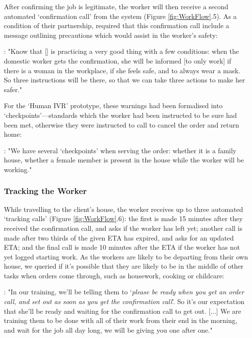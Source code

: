After confirming the job is legitimate, the worker will then receive a second automated `confirmation call' from the system (Figure \ref{fig:WorkFlow}.5). As a condition of their partnership, \NGO{} required that this confirmation call include a message outlining precautions which would assist in the worker's safety:

\begin{displayquote}
\textbf{\NGOOne{}}: "Know that [\PC{}] is practicing a very good thing with a few conditions: when the domestic worker gets the confirmation, she will be informed [to only work] if  there is a woman in the workplace, if she feels safe, and to always wear a mask. So three instructions will be there, so that we can take three actions to make her safer."
\end{displayquote}

For the `Human IVR' prototype, these warnings had been formalised into `checkpoints'---standards which the worker had been instructed to be sure had been met, otherwise they were instructed to call \PC{} to cancel the order and return home:

\begin{displayquote}
\textbf{\PCTwo{}}: "We have several ‘checkpoints’ when serving the order: whether it is a family house, whether a female member is present in the house while the worker will be working."
\end{displayquote}

\subsubsection{Tracking the Worker}

While travelling to the client's house, the worker receives up to three automated `tracking calls' (Figure \ref{fig:WorkFlow}.6): the first is made 15 minutes after they received the confirmation call, and asks if the worker has left yet; another call is made after two thirds of the given ETA has expired, and asks for an updated ETA; and the final call is made 10 minutes after the ETA if the worker has not yet logged starting work. As the workers are likely to be departing from their own house, we queried if it's possible that they are likely to be in the middle of other tasks when orders come through, such as housework, cooking or childcare:

\begin{displayquote}
\textbf{\PCTwo{}}: "In our training, we’ll be telling them to ‘\textit{please be ready when you get an order call, and set out as soon as you get the confirmation call}’. So it’s our expectation that she’ll be ready and waiting for the confirmation call to get out. [...] We are training them to be done with all of their work from their end in the morning, and wait for the job all day long, we will be giving you one after one."
\end{displayquote}

